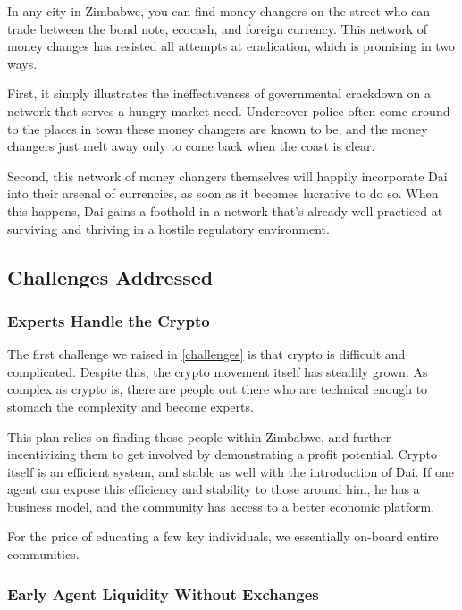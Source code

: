 \documentclass{article}
\begin{document}
In any city in Zimbabwe, you can find money changers on the street who can trade between the bond note, ecocash, and foreign currency. This network of money changes has resisted all attempts at eradication, which is promising in two ways.

First, it simply illustrates the ineffectiveness of governmental crackdown on a network that serves a hungry market need. Undercover police often come around to the places in town these money changers are known to be, and the money changers just melt away only to come back when the coast is clear. 

Second, this network of money changers themselves will happily incorporate Dai into their arsenal of currencies, as soon as it becomes lucrative to do so. When this happens, Dai gains a foothold in a network that's already well-practiced at surviving and thriving in a hostile regulatory
environment.

\subsection{Challenges Addressed} \label{challenges addressed}

\subsubsection{Experts Handle the Crypto} \label{experts}

The first challenge we raised in \ref{challenges} is that crypto is difficult and complicated. Despite this, the crypto movement itself has steadily grown. As complex as crypto is, there are people out there who are technical enough to stomach the complexity and become experts.

This plan relies on finding those people within Zimbabwe, and further incentivizing them to get involved by demonstrating a profit potential. Crypto itself is an efficient system, and stable as well with the introduction of Dai. If one agent can expose this efficiency and stability to those around him, he has a business model, and the community has access to a better economic platform.

For the price of educating a few key individuals, we essentially on-board entire communities.

\subsubsection{Early Agent Liquidity Without Exchanges} \label{early liquidity}
\end{document}
